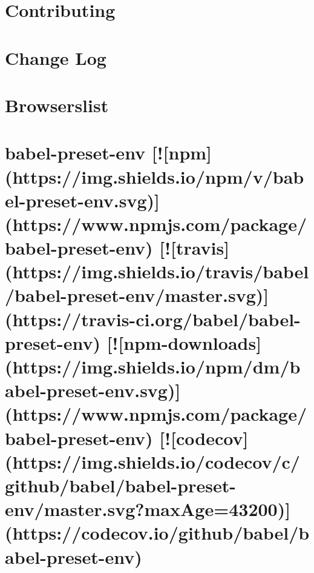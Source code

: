 \documentclass[twoside]{book}
\newcommand{\+}{\discretionary{\mbox{\scriptsize$\hookleftarrow$}}{}{}}
\begin{document}
\chapter{Contributing}
\label{md__c_1_workspace_demo_src_main_script_node_modules_babel-preset-env__c_o_n_t_r_i_b_u_t_i_n_g}

\chapter{Change Log}
\label{md__c_1_workspace_demo_src_main_script_node_modules_babel-preset-env_node_modules_browserslist__c_h_a_n_g_e_l_o_g}

\chapter{Browserslist}
\label{md__c_1_workspace_demo_src_main_script_node_modules_babel-preset-env_node_modules_browserslist__r_e_a_d_m_e}

\chapter{babel-\/preset-\/env \mbox{[}!\mbox{[}npm\mbox{]}(https\+://img.shields.\+io/npm/v/babel-\/preset-\/env.svg)\mbox{]}(https\+://www.npmjs.\+com/package/babel-\/preset-\/env) \mbox{[}!\mbox{[}travis\mbox{]}(https\+://img.shields.\+io/travis/babel/babel-\/preset-\/env/master.svg)\mbox{]}(https\+://travis-\/ci.org/babel/babel-\/preset-\/env) \mbox{[}!\mbox{[}npm-\/downloads\mbox{]}(https\+://img.shields.\+io/npm/dm/babel-\/preset-\/env.svg)\mbox{]}(https\+://www.npmjs.\+com/package/babel-\/preset-\/env) \mbox{[}!\mbox{[}codecov\mbox{]}(https\+://img.shields.\+io/codecov/c/github/babel/babel-\/preset-\/env/master.svg?max\+Age=43200)\mbox{]}(https\+://codecov.io/github/babel/babel-\/preset-\/env)}
\label{md__c_1_workspace_demo_src_main_script_node_modules_babel-preset-env__r_e_a_d_m_e}

\end{document}
